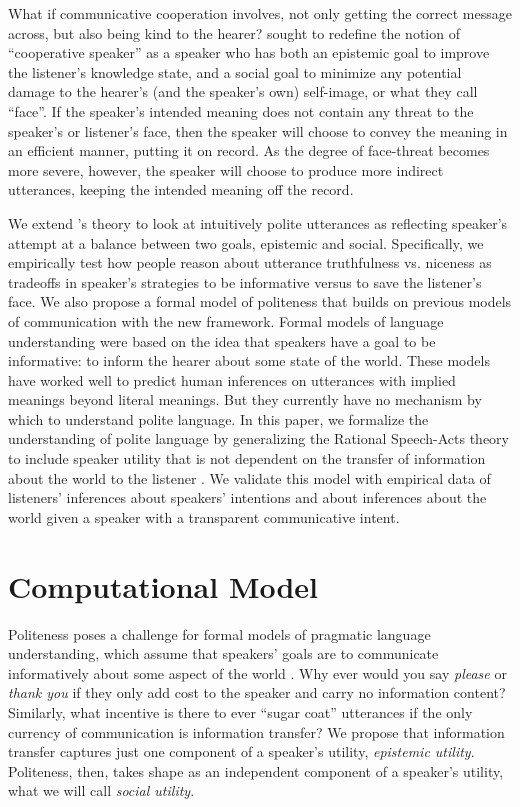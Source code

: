 \documentclass[10pt,letterpaper]{article}
\begin{document}
What if communicative cooperation involves, not only getting the correct message across, but also being kind to the hearer? 
 sought to redefine the notion of ``cooperative speaker'' as a speaker 
who has both an epistemic goal to improve the listener's knowledge state, 
and a social goal to minimize any potential damage to the hearer's (and the speaker's own) self-image, or what they call ``face''.
If the speaker's intended meaning does not contain any threat to the speaker's or listener's face, 
then the speaker will choose to convey the meaning in an efficient manner, putting it on record. 
As the degree of face-threat becomes more severe, however, 
the speaker will choose to produce more indirect utterances, keeping the intended meaning off the record.

We extend 's theory to look at intuitively polite utterances as reflecting speaker's attempt at a balance between two goals, epistemic and social. 
Specifically, we empirically test how people reason about utterance truthfulness vs. niceness 
as tradeoffs in speaker's strategies to be informative versus to save the listener's face. 
We also propose a formal model of politeness that builds on previous models of communication with the new framework.
Formal models of language understanding were based on the idea that
speakers have a goal to be informative: to inform the hearer about some state of the world.
These models have worked well to predict human inferences on utterances with implied meanings beyond literal meanings.
But they currently have no mechanism by which to understand polite language.
In this paper, we formalize the understanding of polite language by generalizing the Rational Speech-Acts theory 
to include speaker utility that is not dependent on the transfer of information about the world to the listener \cite{Frank2012, Goodman2013}.
We validate this model with empirical data of listeners' inferences about speakers' intentions and about inferences about the world given a speaker with a transparent communicative intent. 

\section{Computational Model}

Politeness poses a challenge for formal models of pragmatic language understanding, which assume that speakers' goals are to communicate informatively about some aspect of the world \cite{Frank2012, Goodman2013}. 
Why ever would you say \emph{please} or \emph{thank you} if they only add cost to the speaker and carry no information content?
Similarly, what incentive is there to ever ``sugar coat'' utterances if the only currency of communication is information transfer? 
We propose that information transfer captures just one component of a speaker's utility, \emph{epistemic utility}.
Politeness, then, takes shape as an independent component of a speaker's utility, what we will call \emph{social utility}. 
\end{document}
